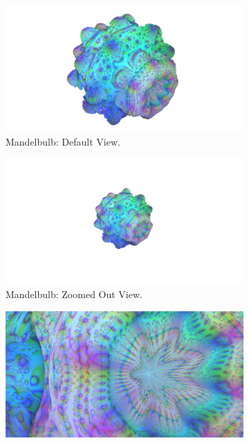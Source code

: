\begin{figure}[ht]
	\centering

	\begin{subfigure}[c]{0.45\linewidth}
		\includegraphics[width=\linewidth, frame]{Images/Results/Mandelbulb-View-01-Default.png}
		\caption{Mandelbulb: Default View.}
		\label{figure:mandelbulb-view-01-default}
	\end{subfigure}
	\hfill
	\begin{subfigure}[c]{0.45\linewidth}
		\includegraphics[width=\linewidth, frame]{Images/Results/Mandelbulb-View-02-Empty-Space.png}
		\caption{Mandelbulb: Zoomed Out View.}
		\label{figure:mandelbulb-view-02-empty-space}
	\end{subfigure}
	\hfill
	\begin{subfigure}[c]{0.45\linewidth}
		\includegraphics[width=\linewidth, frame]{Images/Results/Mandelbulb-View-03-No-Space.png}

\end{subfigure}
\end{figure}
